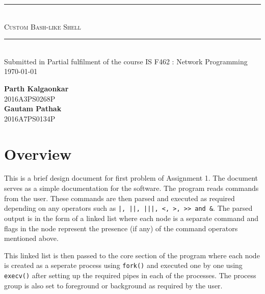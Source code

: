 \documentclass{article}
\begin{document}
\vspace*{3cm}
\begin{center}
\rule{300pt}{1pt}\\
[3mm]
\textsc{\huge Custom Bash-like Shell}\\
\rule{300pt}{1pt}\\
\vspace{5cm}
Submitted in Partial fulfilment of the course IS F462 : Network Programming\\
\vspace{1cm}
\today
\end{center}

\vspace{5cm}
\begin{flushright}
\large{\bfseries Parth Kalgaonkar}\\
2016A3PS0268P\\
\large{\bfseries Gautam Pathak}\\
2016A7PS0134P
\end{flushright}

\newpage
{}
\section{Overview}
This is a brief design document for first problem of Assignment 1. The document serves as a simple documentation for the software. The program reads commands from the user. These commands are then parsed and executed as required depending on any operators such as \lstinline{|, ||, |||, <, >, >> and &}. The parsed output is in the form of a linked list where each node is a separate command and flags in the node represent the presence (if any) of the command operators mentioned above. 

This linked list is then passed to the core section of the program where each node is created as a seperate process using \lstinline{fork()} and executed one by one using \lstinline{execv()} after setting up the required pipes in each of the processes. The process group is also set to foreground or background as required by the user.
\end{document}
